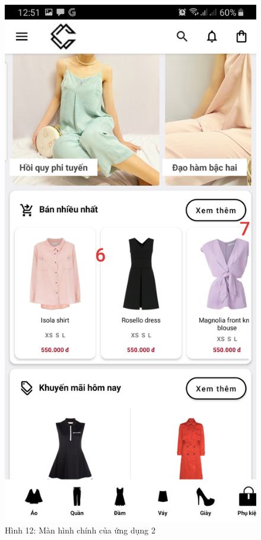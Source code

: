 \documentclass{beamer}
\begin{document}
\begin{frame}
    \begin{columns}
        \begin{figure}
            \centering
            \includegraphics[height=0.7\textheight]{images/07.png}
            \caption{\centering\tiny{Hình 12: Màn hình chính của ứng dụng 2}}


\end{figure}
\end{columns}
\end{frame}
\end{document}
